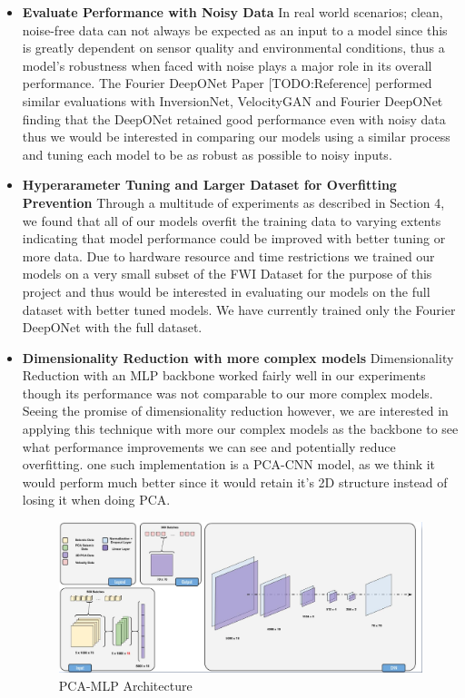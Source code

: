 \documentclass{article}
\begin{document}
\begin{itemize}
    \item \textbf{Evaluate Performance with Noisy Data} In real world scenarios; clean, noise-free data can not always be expected as an input to a model since this is greatly dependent on sensor quality and environmental conditions, thus a model's robustness when faced with noise plays a major role in its overall performance. The Fourier DeepONet Paper [TODO:Reference] performed similar evaluations with InversionNet, VelocityGAN and Fourier DeepONet finding that the DeepONet retained good performance even with noisy data thus we would be interested in comparing our models using a similar process and tuning each model to be as robust as possible to noisy inputs.
    \item \textbf{Hyperarameter Tuning and Larger Dataset for Overfitting Prevention} Through a multitude of experiments as described in Section 4, we found that all of our models overfit the training data to varying extents indicating that model performance could be improved with better tuning or more data. Due to hardware resource and time restrictions we trained our models on a very small subset of the FWI Dataset for the purpose of this project and thus would be interested in evaluating our models on the full dataset with better tuned models. We have currently trained only the Fourier DeepONet with the full dataset. 
    \item \textbf{Dimensionality Reduction with more complex models} Dimensionality Reduction with an MLP backbone worked fairly well in our experiments though its performance was not comparable to our more complex models. Seeing the promise of dimensionality reduction however, we are interested in applying this technique with more our complex models as the backbone to see what performance improvements we can see and potentially reduce overfitting. one such implementation is a PCA-CNN model, as we think it would perform much better since it would retain it's 2D structure instead of losing it when doing PCA.
    \begin{figure}[H]
    \centering
    \includegraphics[width=0.5\linewidth]{figures/conclusion1.png}
    \caption{PCA-MLP Architecture}
    \label{fig:conclusion1}
    \end{figure} 
\end{itemize}
\end{document}
